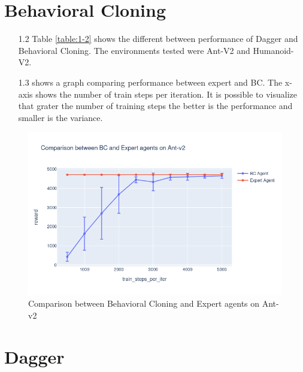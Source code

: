



\lhead{} 

\section{Behavioral Cloning}%
\label{sec:Behavioral Cloning}


\begin{itemize}
    \item [1.2]  Table  \ref{table:1-2} shows the different between performance of Dagger and
        Behavioral Cloning. The environments tested were Ant-V2 and Humanoid-V2.
    \item [1.3]  shows a graph comparing performance between expert and BC. The x-axis shows
        the number of train steps per iteration. It is possible to visualize that grater the number of training steps
        the better is the performance and smaller is the variance.  
     
\end{itemize}

\begin{figure}
\begin{center}
    \includegraphics[scale=0.5]{./figs/comparison_bc_expert.png}
\end{center}
\caption{Comparison between Behavioral Cloning and Expert agents on Ant-v2} 
\label{fig:bcexpert}
\end{figure}

\section{Dagger}%
\label{sec:Dagger}

